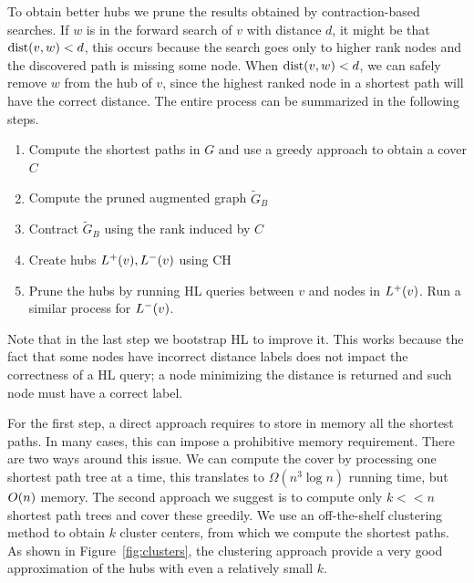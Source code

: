 To obtain better hubs we prune the results obtained by contraction-based searches.
If $w$ is in the forward search of $v$ with distance $d$, it might be that $\text{dist}(v,w)<d$, this occurs because the search goes only to higher rank nodes and the discovered path is missing some node.
When $\text{dist}(v,w)<d$, we can safely remove $w$ from the hub of $v$, since the highest ranked node in a shortest path will have the correct distance.
The entire process can be summarized in the following steps.

\begin{enumerate}[nosep]
\item Compute the shortest paths in $G$ and use a greedy approach to obtain a cover $C$
\item Compute the pruned augmented graph $\tilde G_B$
\item Contract $\tilde G_B$ using the rank induced by $C$
\item Create hubs $L^+(v),L^-(v)$ using CH
\item Prune the hubs by running HL queries between $v$ and nodes in $L^+(v)$. 
Run a similar process for $L^-(v)$.
\end{enumerate}
Note that in the last step we bootstrap HL to improve it.
This works because the fact that some nodes have incorrect distance labels does not impact the correctness of a HL query; a node minimizing the distance is returned and such node must have a correct label.

\begin{remark}
For the first step, a direct approach requires to store in memory all the shortest paths.
In many cases, this can impose a prohibitive memory requirement.
There are two ways around this issue.
We can compute the cover by processing one shortest path tree at a time, this translates to $\Omega(n^3\log n)$ running time, but $O(n)$ memory.
The second approach we suggest is to compute only $k<<n$ shortest path trees and cover these greedily.
We use an off-the-shelf clustering method to obtain $k$ cluster centers, from which we compute the shortest paths. 
As shown in Figure~\ref{fig:clusters}, the clustering approach provide a very good approximation of the hubs with even a relatively small $k$.
\end{remark}

